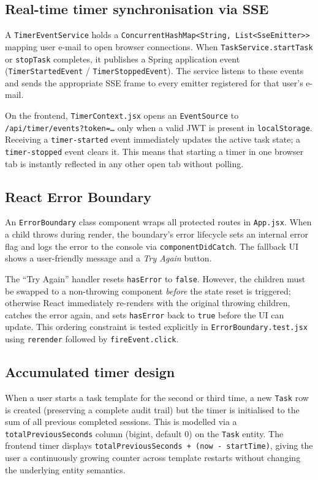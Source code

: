 \documentclass[a4paper, 12pt]{article}
\begin{document}
\subsection{Real-time timer synchronisation via SSE}

A \texttt{TimerEventService} holds a \texttt{ConcurrentHashMap<String, List<SseEmitter>>}
mapping user e-mail to open browser connections. When \texttt{TaskService.startTask} or
\texttt{stopTask} completes, it publishes a Spring application event
(\texttt{TimerStartedEvent} / \texttt{TimerStoppedEvent}). The service listens to these
events and sends the appropriate SSE frame to every emitter registered for that user's e-mail.

On the frontend, \texttt{TimerContext.jsx} opens an \texttt{EventSource} to
\texttt{/api/timer/events?token=\ldots} only when a valid JWT is present in
\texttt{localStorage}. Receiving a \texttt{timer-started} event immediately updates the
active task state; a \texttt{timer-stopped} event clears it. This means that starting a timer
in one browser tab is instantly reflected in any other open tab without polling.

\subsection{React Error Boundary}

An \texttt{ErrorBoundary} class component wraps all protected routes in \texttt{App.jsx}.
When a child throws during render, the boundary's error lifecycle sets an internal error flag
and logs the error to the console via \texttt{componentDidCatch}. The fallback UI shows
a user-friendly message and a \textit{Try Again} button.

The ``Try Again'' handler resets \texttt{hasError} to \texttt{false}. However, the children
must be swapped to a non-throwing component \textit{before} the state reset is triggered;
otherwise React immediately re-renders with the original throwing children, catches the error
again, and sets \texttt{hasError} back to \texttt{true} before the UI can update. This
ordering constraint is tested explicitly in \texttt{ErrorBoundary.test.jsx} using
\texttt{rerender} followed by \texttt{fireEvent.click}.

\subsection{Accumulated timer design}

When a user starts a task template for the second or third time, a new \texttt{Task} row is
created (preserving a complete audit trail) but the timer is initialised to the sum of all
previous completed sessions. This is modelled via a \texttt{totalPreviousSeconds} column
(bigint, default 0) on the \texttt{Task} entity. The frontend timer displays
\texttt{totalPreviousSeconds + (now - startTime)}, giving the user a continuously growing
counter across template restarts without changing the underlying entity semantics.
\end{document}
